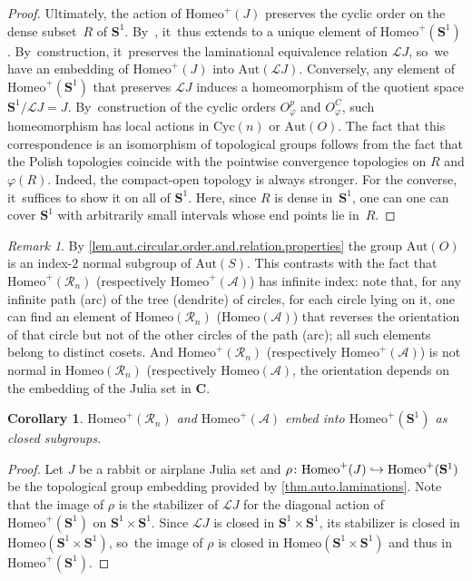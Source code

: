 \documentclass[JEP,XML,SOM,Unicode,NoFloatCountersInSection,published]{cedram}
\newcommand\hto{\mathrel{\lhook\joinrel\to}}
\theoremstyle{plain}
\newtheorem{corollary}[theorem]{Corollary}
\theoremstyle{definition}
\theoremstyle{remark}
\newtheorem{remark}[theorem]{Remark}
\newcommand{\Aut}{\mathrm{Aut}}
\newcommand{\Cyc}{\mathrm{Cyc}}
\newcommand{\Homeo}{\mathrm{Homeo}}
\newcommand{\A}{\mathcal{A}}
\newcommand{\R}{\mathcal{R}}
\newcommand{\C}{\mathbf{C}}
\begin{document}
\begin{proof}
Ultimately, the action of $\Homeo^+(J)$ preserves the cyclic order on the dense subset~$R$ of $\mathbf{S}^1$. By~\cite[Lem.\,3.5]{KaleidoscopicOnCircle}, it~thus extends to a unique element of $\Homeo^+(\mathbf{S}^1)$. By~construction, it~preserves the laminational equivalence relation $\mathcal{L}J$, so~we have an embedding of $\Homeo^+(J)$ into $\Aut(\mathcal{L}J)$.
Conversely, any element of $\Homeo^+(\mathbf{S}^1)$ that preserves $\mathcal{L}J$ induces a homeomorphism of the quotient space $\mathbf{S}^1 / \mathcal{L}J = J$. By~construction of the cyclic orders $O_\varphi^p$ and $O_\varphi^C$, such homeomorphism has local actions in $\Cyc(n)$ or $\Aut(O)$.
The fact that this correspondence is an isomorphism of topological groups follows from the fact that the Polish topologies coincide with the pointwise convergence topologies on $R$ and $\varphi(R)$.
Indeed, the compact-open topology is always stronger.
For the converse, it~suffices to show it on all of $\mathbf{S}^1$.
Here, since $R$ is dense in~$\mathbf{S}^1$, one can one can cover $\mathbf{S}^1$ with arbitrarily small intervals whose end points lie in~$R$.
\end{proof}

\begin{remark}
By \cref{lem.aut.circular.order.and.relation.properties} the group $\Aut(O)$ is an index-$2$ normal subgroup of $\Aut(S)$.
This contrasts with the fact that $\Homeo^+(\R_n)$ (respectively $\Homeo^+(\A)$) has infinite index:
note that, for any infinite path (arc) of the tree (dendrite) of circles, for each circle lying on it, one can find an element of $\Homeo(\R_n)$ ($\Homeo(\A)$) that reverses the orientation of that circle but not of the other circles of the path (arc);
all such elements belong to distinct cosets.
And $\Homeo^+(\R_n)$ (respectively $\Homeo^+(\A)$) is not normal in $\Homeo(\R_n)$ (respectively $\Homeo(\A)$, the orientation depends on the embedding of the Julia set in $\C$.
\end{remark}

\begin{corollary}
\label{cor.lamination.groups.closed.in.circle.group}
$\Homeo^+(\R_n)$ and $\Homeo^+(\A)$ embed into $\Homeo^+(\mathbf{S}^1)$ as closed subgroups.
\end{corollary}

\begin{proof}
Let $J$ be a rabbit or airplane Julia set and $\rho \colon \Homeo^+(J) \hto \Homeo^+(\mathbf{S}^1)$ be the topological group embedding provided by \cref{thm.auto.laminations}.
Note that the image of $\rho$ is the stabilizer of $\mathcal{L}J$ for the diagonal action of $\Homeo^+(\mathbf{S}^1)$ on $\mathbf{S}^1 \times \mathbf{S}^1$.
Since $\mathcal{L}J$ is closed in $\mathbf{S}^1\times\mathbf{S}^1$, its stabilizer is closed in $\Homeo(\mathbf{S}^1\times\mathbf{S}^1)$, so~the image of $\rho$ is closed in $\Homeo(\mathbf{S}^1\times\mathbf{S}^1)$ and thus in $\Homeo^+(\mathbf{S}^1)$.
\end{proof}
\end{document}
